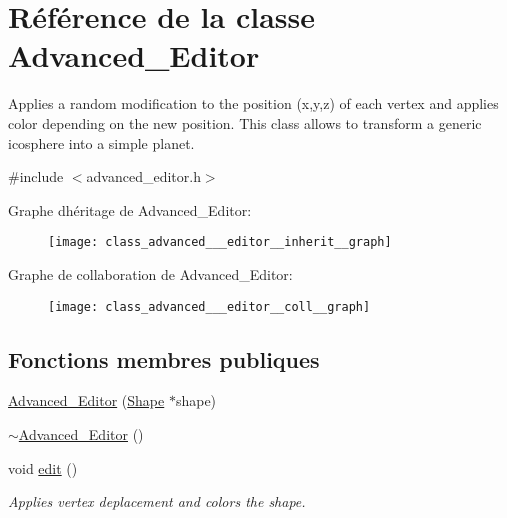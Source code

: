 \hypertarget{class_advanced___editor}{}\section{Référence de la classe Advanced\+\_\+\+Editor}
\label{class_advanced___editor}


Applies a random modification to the position (x,y,z) of each vertex and applies color depending on the new position. This class allows to transform a generic icosphere into a simple planet.  




{\ttfamily \#include $<$advanced\+\_\+editor.\+h$>$}



Graphe d\textquotesingle{}héritage de Advanced\+\_\+\+Editor\+:
\nopagebreak
\begin{figure}[H]
\begin{center}
\leavevmode
\texttt{[image: class\_advanced\_\_\_editor\_\_inherit\_\_graph]}
\end{center}
\end{figure}


Graphe de collaboration de Advanced\+\_\+\+Editor\+:
\nopagebreak
\begin{figure}[H]
\begin{center}
\leavevmode
\texttt{[image: class\_advanced\_\_\_editor\_\_coll\_\_graph]}
\end{center}
\end{figure}
\subsection*{Fonctions membres publiques}
\begin{DoxyCompactItemize}
\item 
\hyperlink{class_advanced___editor_a5727b0fb3127ff32135d4b0e39a605e5}{Advanced\+\_\+\+Editor} (\hyperlink{class_shape}{Shape} $\ast$shape)
\item 
\hyperlink{class_advanced___editor_ade8499e109f05ddbb4430f12a9cd12d2}{$\sim$\+Advanced\+\_\+\+Editor} ()
\item 
void \hyperlink{class_advanced___editor_afc51cb1199403cb6785bfd3d7e290a1b}{edit} ()
\begin{DoxyCompactList}\small\item\em Applies vertex deplacement and colors the shape. \end{DoxyCompactList}\end{DoxyCompactItemize}
